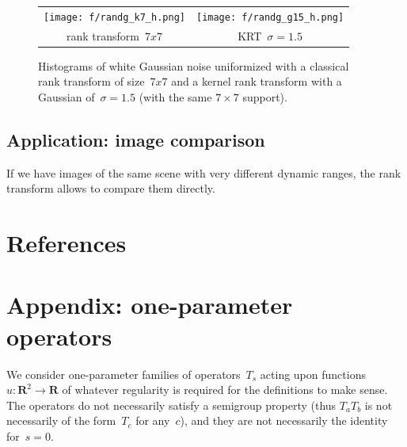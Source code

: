 \documentclass[12pt]{article}                  %
\begin{document}
\begin{figure}[p]
	\begin{tabular}{cc}
		\texttt{[image: f/randg\_k7\_h.png]} &
		\texttt{[image: f/randg\_g15\_h.png]} \\
		rank transform~$7x7$ &
		KRT~$\sigma=1.5$
	\end{tabular}
	\caption{\label{fig:histograms}
	Histograms of white Gaussian noise uniformized with a classical
	rank transform of size~$7x7$ and a kernel rank transform with a
	Gaussian of~$\sigma=1.5$ (with the same $7\times7$ support).
	}
\end{figure}


\subsection{Application: image comparison}

If we have images of the same scene with very different dynamic ranges, the
rank transform allows to compare them directly.   


\section{References}




\section*{Appendix: one-parameter operators}

We consider one-parameter families of operators~$T_s$ acting upon
functions~$u:\mathbf{R}^2\to\mathbf{R}$ of whatever regularity is required
for the definitions to make sense.  The operators do not necessarily satisfy
a semigroup property (thus $T_aT_b$ is not necessarily of the form~$T_c$ for
any~$c$), and they are not necessarily the identity for~$s=0$.
\end{document}
